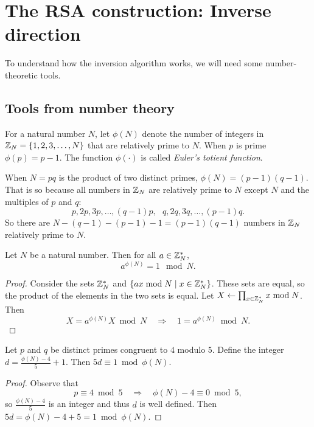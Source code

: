 \section{The RSA construction: Inverse direction}

To understand how the inversion algorithm works, we will need some
number-theoretic tools.


\subsection{Tools from number theory}
For a natural number $N$, let $\phi(N)$ denote the number of integers
in $\mathbb{Z}_N = \{1, 2, 3, \dots, N\}$ that are relatively prime to $N$.
When $p$ is prime $\phi(p) = p-1$.
The function $\phi(\cdot)$ is called \emph{Euler's totient function}.

When $N=pq$ is the product of two distinct primes, $\phi(N) = (p-1)(q-1)$.
That is so because all numbers in $\mathbb{Z}_N$ are relatively prime to $N$ except
$N$ and the multiples of $p$ and $q$:
\[ p, 2p, 3p, \dots, (q-1)p,\ \ \ q, 2q, 3q, \dots, (p-1)q.\]
So there are $N - (q-1) - (p-1) - 1 = (p-1)(q-1)$ numbers
in $\mathbb{Z}_N$ relatively prime to $N$.

\begin{theorem}\label{thm:euler}
Let $N$ be a natural number. Then for all $a \in \mathbb{Z}^*_N$,
\[ a^{\phi(N)} = 1 \mod N.\]
\end{theorem}
\begin{proof}
Consider the sets $\mathbb{Z}^*_N$ and $\{ax \bmod N \mid x \in \mathbb{Z}^*_N\}$.
These sets are equal, so the product of the elements in the two
sets is equal.
Let $X \gets \prod_{x \in \mathbb{Z}^*_N} x \bmod N$.
Then 
\[ X = a^{\phi(N)}X \bmod N \quad \Rightarrow\quad 1 = a^{\phi(N)} \bmod N.\]
\end{proof}



\begin{lemma}\label{lemma:inv}
Let $p$ and $q$ be distinct primes congruent to $4$ modulo $5$.
Define the integer $d = \frac{\phi(N) - 4}{5} + 1$.
Then $5d \equiv 1 \bmod \phi(N)$.
\end{lemma}

\begin{proof}
Observe that
\[ p \equiv 4 \bmod 5 \quad \Rightarrow \quad \phi(N) - 4 \equiv 0 \bmod 5,\]
so $\frac{\phi(N) - 4}{5}$ is an integer and thus $d$ is well defined.
Then $5 d = \phi(N) - 4 + 5 = 1 \bmod \phi(N)$.
\end{proof}


